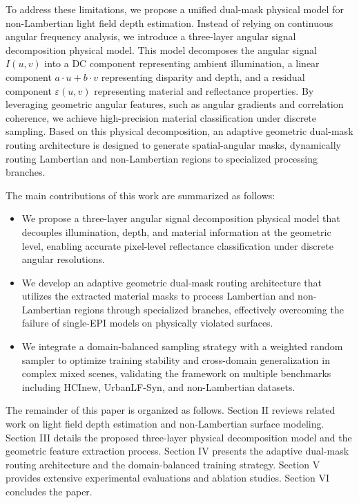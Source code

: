 To address these limitations, we propose a unified dual-mask physical model for non-Lambertian light field depth estimation. Instead of relying on continuous angular frequency analysis, we introduce a three-layer angular signal decomposition physical model. This model decomposes the angular signal $I(u,v)$ into a DC component representing ambient illumination, a linear component $a \cdot u + b \cdot v$ representing disparity and depth, and a residual component $\varepsilon(u,v)$ representing material and reflectance properties. By leveraging geometric angular features, such as angular gradients and correlation coherence, we achieve high-precision material classification under discrete sampling. Based on this physical decomposition, an adaptive geometric dual-mask routing architecture is designed to generate spatial-angular masks, dynamically routing Lambertian and non-Lambertian regions to specialized processing branches.

The main contributions of this work are summarized as follows:
\begin{itemize}
 \item We propose a three-layer angular signal decomposition physical model that decouples illumination, depth, and material information at the geometric level, enabling accurate pixel-level reflectance classification under discrete angular resolutions.
 \item We develop an adaptive geometric dual-mask routing architecture that utilizes the extracted material masks to process Lambertian and non-Lambertian regions through specialized branches, effectively overcoming the failure of single-EPI models on physically violated surfaces.
 \item We integrate a domain-balanced sampling strategy with a weighted random sampler to optimize training stability and cross-domain generalization in complex mixed scenes, validating the framework on multiple benchmarks including HCInew, UrbanLF-Syn, and non-Lambertian datasets.
\end{itemize}
The remainder of this paper is organized as follows. Section II reviews related work on light field depth estimation and non-Lambertian surface modeling. Section III details the proposed three-layer physical decomposition model and the geometric feature extraction process. Section IV presents the adaptive dual-mask routing architecture and the domain-balanced training strategy. Section V provides extensive experimental evaluations and ablation studies. Section VI concludes the paper.

